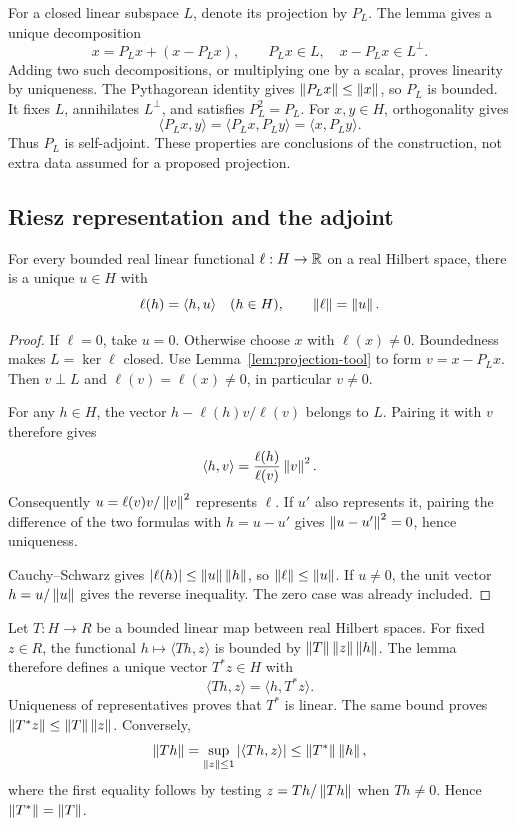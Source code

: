 For a closed linear subspace \(L\), denote its projection by \(P_L\). The lemma gives a unique decomposition
\[
 x=P_Lx+(x-P_Lx),\qquad P_Lx\in L,\quad x-P_Lx\in L^\perp.
\]
Adding two such decompositions, or multiplying one by a scalar, proves linearity by uniqueness. The Pythagorean identity gives \(\left\lVert P_Lx\right\rVert\le\left\lVert x\right\rVert\), so \(P_L\) is bounded. It fixes \(L\), annihilates \(L^\perp\), and satisfies \(P_L^2=P_L\). For \(x,y\in H\), orthogonality gives
\[
 \langle P_Lx,y\rangle=\langle P_Lx,P_Ly\rangle
 =\langle x,P_Ly\rangle.
\]
Thus \(P_L\) is self-adjoint. These properties are conclusions of the construction, not extra data assumed for a proposed projection.

\subsection{Riesz representation and the adjoint}
\begin{lemma}\label{lem:riesz-tool}
For every bounded real linear functional \(\ell:H\to\mathbb R\) on a real Hilbert space, there is a unique \(u\in H\) with
\[
 \ell(h)=\langle h,u\rangle\quad(h\in H),\qquad \left\lVert\ell\right\rVert=\left\lVert u\right\rVert.
\]
\end{lemma}
\begin{proof}
If \(\ell=0\), take \(u=0\). Otherwise choose \(x\) with \(\ell(x)\ne0\). Boundedness makes \(L=\ker\ell\) closed. Use Lemma~\ref{lem:projection-tool} to form \(v=x-P_Lx\). Then \(v\perp L\) and \(\ell(v)=\ell(x)\ne0\), in particular \(v\ne0\).

For any \(h\in H\), the vector \(h-\ell(h)v/\ell(v)\) belongs to \(L\). Pairing it with \(v\) therefore gives
\[
 \langle h,v\rangle=\frac{\ell(h)}{\ell(v)}\left\lVert v\right\rVert^2.
\]
Consequently \(u=\ell(v)v/\left\lVert v\right\rVert^2\) represents \(\ell\). If \(u'\) also represents it, pairing the difference of the two formulas with \(h=u-u'\) gives \(\left\lVert u-u'\right\rVert^2=0\), hence uniqueness.

Cauchy--Schwarz gives \(|\ell(h)|\le\left\lVert u\right\rVert\left\lVert h\right\rVert\), so \(\left\lVert\ell\right\rVert\le\left\lVert u\right\rVert\). If \(u\ne0\), the unit vector \(h=u/\left\lVert u\right\rVert\) gives the reverse inequality. The zero case was already included.
\end{proof}

Let \(T:H\to R\) be a bounded linear map between real Hilbert spaces. For fixed \(z\in R\), the functional \(h\mapsto\langle Th,z\rangle\) is bounded by \(\left\lVert T\right\rVert\left\lVert z\right\rVert\left\lVert h\right\rVert\). The lemma therefore defines a unique vector \(T^*z\in H\) with
\[
 \langle Th,z\rangle=\langle h,T^*z\rangle.
\]
Uniqueness of representatives proves that \(T^*\) is linear. The same bound proves \(\left\lVert T^*z\right\rVert\le\left\lVert T\right\rVert\left\lVert z\right\rVert\). Conversely,
\[
 \left\lVert Th\right\rVert=\sup_{\left\lVert z\right\rVert\le1}|\langle Th,z\rangle|
 \le\left\lVert T^*\right\rVert\left\lVert h\right\rVert,
\]
where the first equality follows by testing \(z=Th/\left\lVert Th\right\rVert\) when \(Th\ne0\). Hence \(\left\lVert T^*\right\rVert=\left\lVert T\right\rVert\).

